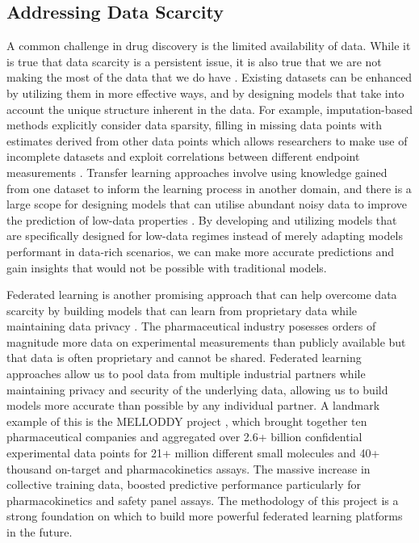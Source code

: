 \subsection{Addressing Data Scarcity}
A common challenge in drug discovery is the limited availability of data. While it is true that data scarcity is a persistent issue, it is also true that we are not making the most of the data that we do have \cite{Bender2021part2}. Existing datasets can be enhanced by utilizing them in more effective ways, and by designing models that take into account the unique structure inherent in the data. For example, imputation-based methods explicitly consider data sparsity, filling in missing data points with estimates derived from other data points which allows researchers to make use of incomplete datasets and exploit correlations between different endpoint measurements \cite{Irwin2020Imputation, Irwin2021Imputation, Tse2021OpenMalaria}. Transfer learning approaches involve using knowledge gained from one dataset to inform the learning process in another domain, and there is a large scope for designing models that can utilise abundant noisy data to improve the prediction of low-data properties \cite{Wenzel2019ADMETox, Obrezanova2022InVivo}. By developing and utilizing models that are specifically designed for low-data regimes instead of merely adapting models performant in data-rich scenarios, we can make more accurate predictions and gain insights that would not be possible with traditional models.

Federated learning is another promising approach that can help overcome data scarcity by building models that can learn from proprietary data while maintaining data privacy \cite{Li2020FedLearning}. The pharmaceutical industry posesses orders of magnitude more data on experimental measurements than publicly available but that data is often proprietary and cannot be shared. Federated learning approaches allow us to pool data from multiple industrial partners while maintaining privacy and security of the underlying data, allowing us to build models more accurate than possible by any individual partner. A landmark example of this is the MELLODDY project \cite{Wouter2022Melloddy, Oldenhof2022Melloddy}, which brought together ten pharmaceutical companies and aggregated over 2.6+ billion confidential experimental data points for 21+ million different small molecules and 40+ thousand on-target and pharmacokinetics assays. The massive increase in collective training data, boosted predictive performance particularly for pharmacokinetics and safety panel assays. The methodology of this project is a strong foundation on which to build more powerful federated learning platforms in the future.

